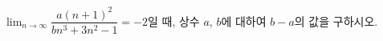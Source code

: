 $\displaystyle\lim_{n\to\infty}\dfrac{a(n+1)^2}{bn^3+3n^2-1}=-2$일 때, 상수 $a$, $b$에 대하여 $b-a$의 값을 구하시오.
